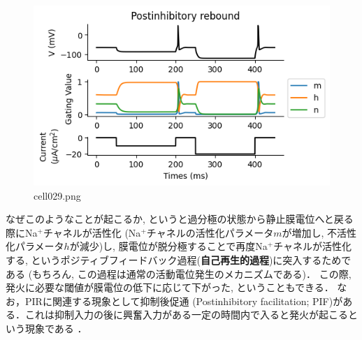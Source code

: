 \begin{figure}[ht]
	\centering
	\includegraphics[scale=0.8, max width=\linewidth]{./fig/neuron-model/hodgkin-huxley/cell029.png}
	\caption{cell029.png}
	\label{cell029.png}
\end{figure}
なぜこのようなことが起こるか, というと過分極の状態から静止膜電位へと戻る際にNa$^+$チャネルが活性化 (Na$^+$チャネルの活性化パラメータ$m$が増加し, 不活性化パラメータ$h$が減少)し, 膜電位が脱分極することで再度Na$^+$チャネルが活性化する, というポジティブフィードバック過程(\textbf{自己再生的過程})に突入するためである (もちろん, この過程は通常の活動電位発生のメカニズムである)． この際, 発火に必要な閾値が膜電位の低下に応じて下がった, ということもできる．
なお，PIRに関連する現象として抑制後促通 (Postinhibitory facilitation; PIF)がある．これは抑制入力の後に興奮入力がある一定の時間内で入ると発火が起こるという現象である \citep{Dodla2006-fj}．
